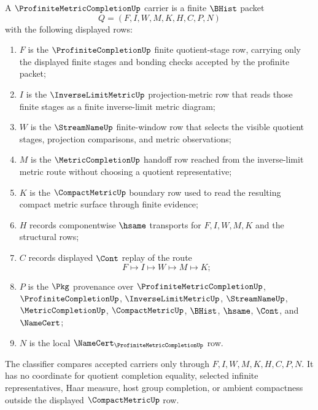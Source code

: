 \begin{definition}
\label{def:profinite-metric-completion-carrier}
A $\ProfiniteMetricCompletionUp$ carrier is a finite $\BHist$ packet
$$
Q=(F,I,W,M,K,H,C,P,N)
$$
with the following displayed rows:
\begin{enumerate}
\item $F$ is the $\ProfiniteCompletionUp$ finite quotient-stage row, carrying only the displayed finite stages and bonding checks accepted by the profinite packet;
\item $I$ is the $\InverseLimitMetricUp$ projection-metric row that reads those finite stages as a finite inverse-limit metric diagram;
\item $W$ is the $\StreamNameUp$ finite-window row that selects the visible quotient stages, projection comparisons, and metric observations;
\item $M$ is the $\MetricCompletionUp$ handoff row reached from the inverse-limit metric route without choosing a quotient representative;
\item $K$ is the $\CompactMetricUp$ boundary row used to read the resulting compact metric surface through finite evidence;
\item $H$ records componentwise $\hsame$ transports for $F,I,W,M,K$ and the structural rows;
\item $C$ records displayed $\Cont$ replay of the route
$$
F\longmapsto I\longmapsto W\longmapsto M\longmapsto K ;
$$
\item $P$ is the $\Pkg$ provenance over $\ProfiniteMetricCompletionUp$, $\ProfiniteCompletionUp$, $\InverseLimitMetricUp$, $\StreamNameUp$, $\MetricCompletionUp$, $\CompactMetricUp$, $\BHist$, $\hsame$, $\Cont$, and $\NameCert$;
\item $N$ is the local $\NameCert_{\ProfiniteMetricCompletionUp}$ row.
\end{enumerate}
The classifier compares accepted carriers only through $F,I,W,M,K,H,C,P,N$. It has no coordinate for quotient completion equality, selected infinite representatives, Haar measure, host group completion, or ambient compactness outside the displayed $\CompactMetricUp$ row.
\end{definition}

